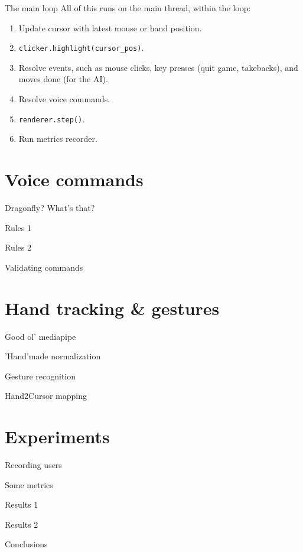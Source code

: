 \documentclass[english]{beamer}
\begin{document}
\begin{frame}{The main loop}
    All of this runs on the main thread, within the loop:

    \begin{enumerate}
        \item Update cursor with latest mouse or hand position.
        \item \texttt{clicker.highlight(cursor\_pos)}.
        \item Resolve events, such as mouse clicks, key presses (quit game, takebacks), and moves done (for the AI).
        \item Resolve voice commands.
        \item \texttt{renderer.step()}.
        \item Run metrics recorder.
    \end{enumerate}
\end{frame}

\section{Voice commands}
\begin{frame}{Dragonfly? What's that?}
\end{frame}

\begin{frame}{Rules 1}
\end{frame}

\begin{frame}{Rules 2}
\end{frame}

\begin{frame}{Validating commands}
\end{frame}


\section{Hand tracking \& gestures}
\begin{frame}{Good ol' mediapipe}
\end{frame}

\begin{frame}{'Hand'made normalization}
\end{frame}

\begin{frame}{Gesture recognition}
\end{frame}

\begin{frame}{Hand2Cursor mapping}
\end{frame}

\section{Experiments}
\begin{frame}{Recording users}
\end{frame}

\begin{frame}{Some metrics}
\end{frame}

\begin{frame}{Results 1}
\end{frame}

\begin{frame}{Results 2}
\end{frame}


\begin{frame}{Conclusions}
\end{frame}
\end{document}
